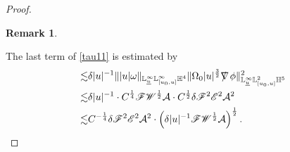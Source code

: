 \documentclass[11pt,reqno]{amsart}
\theoremstyle{definition}
\newtheorem{remark}{Remark}[section]
\numberwithin{equation}{section}
\renewcommand{\L}{\mathbb{L}}
\renewcommand{\H}{\mathbb{H}}
\def\ub{\underline{u}}
\def\nablas{\mbox{$\nabla \mkern -13mu /$ }}
\begin{document}
\begin{proof}
\begin{remark}
\begin{equation}
\end{equation}
\end{remark}
The last term of \eqref{tau11} is estimated by
\begin{align*}
\lesssim&\delta|u|^{-1}\||u|\omega\|_{\L^\infty_{\ub}\L^\infty_{[u_0,u]}\H^4}\|\Omega_0|u|^{\frac{3}{2}}\nablas\phi\|_{\L^\infty_{\ub}\L^2_{[u_0,u]}\H^5}^2\\
\lesssim&\delta|u|^{-1}\cdot C^{\frac{1}{4}}\mathscr{F}\mathscr{W}^{\frac{1}{2}}\mathcal{A}\cdot C^{\frac{1}{2}}\delta\mathscr{F}^2\mathscr{E}^2\mathcal{A}^2\\
\lesssim& C^{-\frac{1}{4}}\delta\mathscr{F}^2\mathscr{E}^2\mathcal{A}^2\cdot\left(\delta|u|^{-1}\mathscr{F}\mathscr{W}^{\frac{1}{2}}\mathcal{A}\right)^{\frac{1}{2}}.
\end{align*}


\end{proof}
\end{document}

